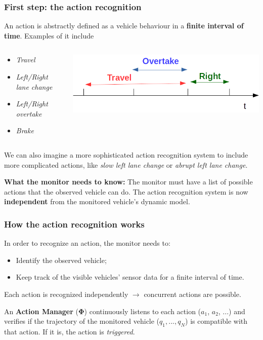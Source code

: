 \documentclass{beamer}
\begin{document}
\begin{frame}
\frametitle{First step: the action recognition}
An action is abstractly defined as a vehicle behaviour in a \textbf{finite interval of time}. Examples of
it include 
\begin{columns}
\begin{column}{0.4\textwidth}
\begin{itemize}
\item \textit{Travel}
\item \textit{Left/Right lane change}
\item \textit{Left/Right overtake}
\item \textit{Brake}
\end{itemize}
\end{column}
\begin{column}{0.6\textwidth}
\flushright
\includegraphics[scale=0.4]{actionsTimeline}
\end{column}
\end{columns}

\bigskip

We can also imagine a more sophisticated action recognition system
to include more complicated actions, like \textit{slow left lane change} or
\textit{abrupt left lane change}.\\

\begin{block}{\textbf{What the monitor needs to know:}}
The monitor must have a list of possible actions that the 
observed vehicle can do. The action recognition system is now \textbf{independent} from the monitored vehicle's dynamic model. 
\end{block}

\end{frame}

\begin{frame}
\frametitle{How the action recognition works}
In order to recognize an action, the monitor needs to:
\begin{itemize}
\item Identify the observed vehicle;
\item Keep track of the visible vehicles' sensor data for a finite interval of time.
\end{itemize}

Each action is recognized independently $\rightarrow$ concurrent actions are possible.

\bigskip

An \textbf{Action Manager} ($\mathbf{\Phi}$) continuously listens to each action ($a_1$, $a_2$, ...) and verifies if the trajectory of the monitored vehicle ($q_1, ..., q_N$) is compatible with that action. If it is, the action is \emph{triggered}.

\end{frame}
\end{document}
